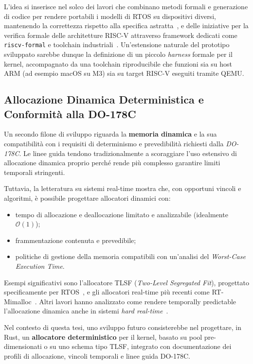 \documentclass[italian, Lau, oneside]{sapthesis} %
\begin{document}
L’idea si inserisce nel solco dei lavori che combinano metodi formali e generazione di codice per rendere portabili i modelli di RTOS su dispositivi diversi, mantenendo la correttezza rispetto alla specifica astratta~\cite{ref:gomes2024}, e delle iniziative per la verifica formale delle architetture RISC-V attraverso framework dedicati come \texttt{riscv-formal} e toolchain industriali~\cite{ref:yosyshq2025,ref:lubis2025,ref:kumar2023}. Un’estensione naturale del prototipo sviluppato sarebbe dunque la definizione di un piccolo \textit{harness} formale per il kernel, accompagnato da una toolchain riproducibile che funzioni sia su host ARM (ad esempio macOS su M3) sia su target RISC-V eseguiti tramite QEMU.

\subsection*{Allocazione Dinamica Deterministica e Conformità alla DO-178C}

Un secondo filone di sviluppo riguarda la \textbf{memoria dinamica} e la sua compatibilità con i requisiti di determinismo e prevedibilità richiesti dalla \textit{DO-178C}. Le linee guida tendono tradizionalmente a scoraggiare l’uso estensivo di allocazione dinamica proprio perché rende più complesso garantire limiti temporali stringenti.~\cite{ref:adacore2021,ref:easa2023,ref:fischer2025}

Tuttavia, la letteratura su sistemi real-time mostra che, con opportuni vincoli e algoritmi, è possibile progettare allocatori dinamici con:
\begin{itemize}
    \item tempo di allocazione e deallocazione limitato e analizzabile (idealmente $\mathcal{O}(1)$);
    \item frammentazione contenuta e prevedibile;
    \item politiche di gestione della memoria compatibili con un’analisi del \textit{Worst-Case Execution Time}.
\end{itemize}

Esempi significativi sono l’allocatore TLSF (\textit{Two-Level Segregated Fit}), progettato specificamente per RTOS~\cite{ref:masmano2004,ref:masmano2008}, e gli allocatori real-time più recenti come RT-Mimalloc~\cite{ref:giannessi2024}.  
Altri lavori hanno analizzato come rendere temporally predictable l’allocazione dinamica anche in sistemi \textit{hard real-time}~\cite{ref:herter2014,ref:park2020}.  

Nel contesto di questa tesi, uno sviluppo futuro consisterebbe nel progettare, in Rust, un \textbf{allocatore deterministico} per il kernel, basato su pool pre-dimensionati o su uno schema tipo TLSF, integrato con documentazione dei profili di allocazione, vincoli temporali e linee guida DO-178C.
\end{document}
